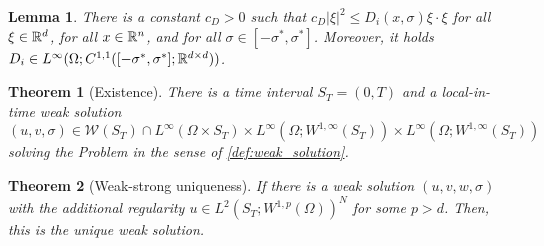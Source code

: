 \documentclass[10pt,a4paper]{amsart}
\newtheorem{lem}{Lemma}
\newtheorem{thm}{Theorem}
\def\R{{\Bbb R}}
\begin{document}
\begin{lem}\label{lemma:lipschitz.diffusivity}
There is a constant $c_D>0$ such that
%
$
c_D|\xi|^2\leq D_i(x,\sigma)\xi\cdot\xi
$
for all $\xi\in\R^d$, for all $x\in\R^n$, and for all $\sigma\in[-\sigma^*,\sigma^*]$.
Moreover, it holds $D_i\in L^\infty(\Omega;C^{1,1}([-\sigma^*,\sigma^*];\R^{d\times d}))$.
\end{lem}

\begin{thm}[Existence]\label{thm.existence}
There is a time interval $S_T=(0,T)$ and a local-in-time weak solution 
\[
(u,v,\sigma)\in \mathcal{W}(S_T)\cap L^\infty(\Omega\times S_T)\times L^\infty(\Omega;W^{1,\infty}(S_T))\times L^\infty(\Omega;W^{1,\infty}(S_T))
\]
solving the Problem in the sense of \cref{def:weak_solution}.
\end{thm}

\begin{thm}[Weak-strong uniqueness]\label{thm.uniqueness}
    If there is a weak solution $(u,v,w,\sigma)$ with the additional regularity $u\in L^2(S_T;W^{1,p}(\Omega))^N$ for some $p>d$.
    Then, this is the unique weak solution.
\end{thm}
\end{document}
